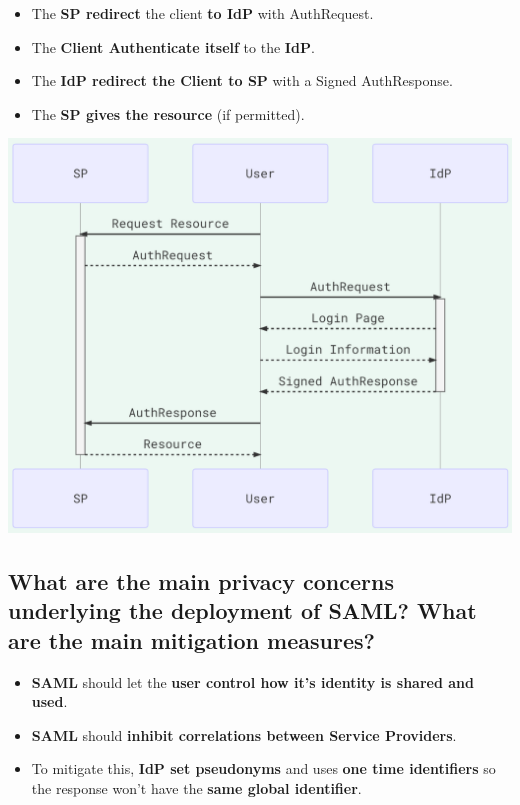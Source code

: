\documentclass[9pt, letterpaper]{article}
\begin{document}
\begin{itemize}
\begin{itemize}
\begin{itemize}
		            \end{itemize}
		      \item The \textbf{SP redirect} the client \textbf{to IdP} with AuthRequest.
		      \item The \textbf{Client Authenticate itself} to the \textbf{IdP}.
		      \item The \textbf{IdP redirect the Client to SP} with a Signed AuthResponse.
		      \item The \textbf{SP gives the resource} (if permitted).
	      \end{itemize}
	      \begin{center}
		      \includegraphics[scale=0.6]{SSO_SP.png}
	      \end{center}
\end{itemize}

\subsection{What are the main privacy concerns underlying the deployment of SAML? What are the main mitigation measures?}
\begin{itemize}
	\item \textbf{SAML} should let the \textbf{user control how it's identity is shared and used}.
	\item \textbf{SAML} should \textbf{inhibit correlations between Service Providers}.
	\item To mitigate this, \textbf{IdP set pseudonyms} and uses \textbf{one time identifiers} so the response won't have the \textbf{same global identifier}.
\end{itemize}
\end{document}

